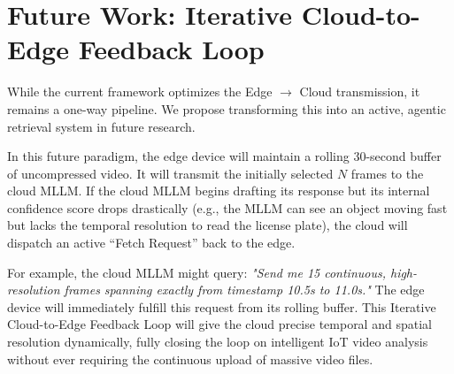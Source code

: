 \documentclass[12pt, a4paper]{report}
\begin{document}
\section{Future Work: Iterative Cloud-to-Edge Feedback Loop}
While the current framework optimizes the Edge $\rightarrow$ Cloud transmission, it remains a one-way pipeline. We propose transforming this into an active, agentic retrieval system in future research.

In this future paradigm, the edge device will maintain a rolling 30-second buffer of uncompressed video. It will transmit the initially selected $N$ frames to the cloud MLLM. If the cloud MLLM begins drafting its response but its internal confidence score drops drastically (e.g., the MLLM can see an object moving fast but lacks the temporal resolution to read the license plate), the cloud will dispatch an active ``Fetch Request'' back to the edge.

For example, the cloud MLLM might query: \textit{"Send me 15 continuous, high-resolution frames spanning exactly from timestamp 10.5s to 11.0s."} The edge device will immediately fulfill this request from its rolling buffer. This Iterative Cloud-to-Edge Feedback Loop will give the cloud precise temporal and spatial resolution dynamically, fully closing the loop on intelligent IoT video analysis without ever requiring the continuous upload of massive video files.
\end{document}
